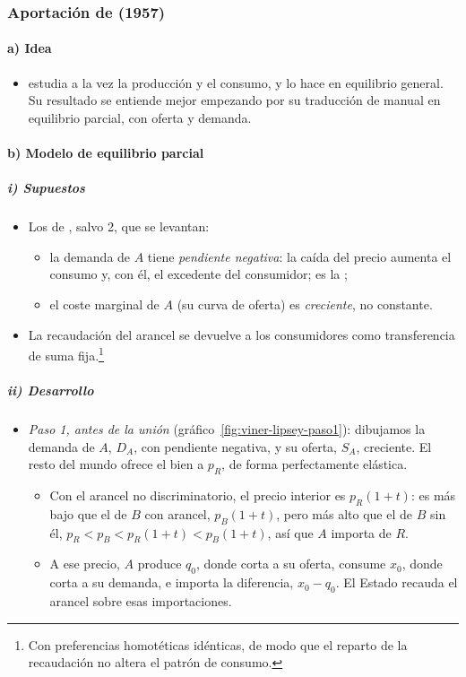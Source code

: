 \documentclass[11pt]{article}
\begin{document}
\subsubsection{Aportación de  (1957)}\label{sec:lipsey}

\paragraph{a) Idea}

\begin{itemize}
\item \textcite{Lipsey1957Theory} estudia a la vez la producción y el consumo, y lo hace en equilibrio general. Su resultado se entiende mejor empezando por su traducción de manual en equilibrio parcial, con oferta y demanda.
\end{itemize}

\paragraph{b) Modelo de equilibrio parcial}

\subparagraph{i) Supuestos}

\begin{itemize}
\item Los de , salvo 2, que se levantan:
  \begin{itemize}
  \item la demanda de $A$ tiene \emph{pendiente negativa}: la caída del precio aumenta el consumo y, con él, el excedente del consumidor; es la ;
  \item el coste marginal de $A$ (su curva de oferta) es \emph{creciente}, no constante.
  \end{itemize}
\item La recaudación del arancel se devuelve a los consumidores como transferencia de suma fija.\footnote{Con preferencias homotéticas idénticas, de modo que el reparto de la recaudación no altera el patrón de consumo.}
\end{itemize}

\subparagraph{ii) Desarrollo}

\begin{itemize}
\item \emph{Paso 1, antes de la unión} (gráfico~\ref{fig:viner-lipsey-paso1}): dibujamos la demanda de $A$, $D_A$, con pendiente negativa, y su oferta, $S_A$, creciente. El resto del mundo ofrece el bien a $p_R$, de forma perfectamente elástica.
  \begin{itemize}
  \item Con el arancel no discriminatorio, el precio interior es $p_R(1+t)$: es más bajo que el de $B$ con arancel, $p_B(1+t)$, pero más alto que el de $B$ sin él, $p_R<p_B<p_R(1+t)<p_B(1+t)$, así que $A$ importa de $R$.
  \item A ese precio, $A$ produce $q_0$, donde corta a su oferta, consume $x_0$, donde corta a su demanda, e importa la diferencia, $x_0-q_0$. El Estado recauda el arancel sobre esas importaciones.
  \end{itemize}
\end{itemize}
\end{document}
